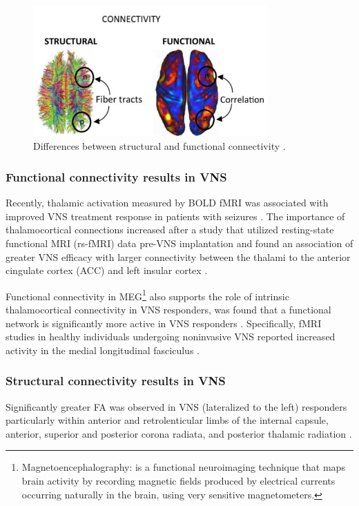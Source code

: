     \begin{figure}[h]
      \centering
      \includegraphics[width=0.8\textwidth]{images/structuralFunctional.png}
      \caption{Differences between structural and functional connectivity \cite{CABRAL201784}.}
      \label{fig:Structural and Functional Connections}
    \end{figure}

    \subsubsection*{Functional connectivity results in VNS}
    Recently, thalamic activation measured by BOLD fMRI was associated with improved VNS treatment response in patients with seizures \cite{NarayananWatts2002}. The importance of thalamocortical connections increased after a study that utilized resting-state functional MRI (rs-fMRI) data pre-VNS implantation and found an association of greater VNS efficacy with larger connectivity between the thalami to the anterior cingulate cortex (ACC) and left insular cortex \cite{IBRAHIM2017634}. 
    
    Functional connectivity in MEG\footnote{Magnetoencephalography: is a functional neuroimaging technique that maps brain activity by recording magnetic fields produced by electrical currents occurring naturally in the brain, using very sensitive magnetometers.} also supports the role of intrinsic thalamocortical connectivity in VNS responders, was found that a functional network is significantly more active in VNS responders \cite{Mithani2019, Mithani2020}. Specifically, fMRI studies in healthy individuals undergoing noninvasive VNS reported increased activity in the medial longitudinal fasciculus \cite{frangos2017access}.

    \subsubsection*{Structural connectivity results in VNS}
    Significantly greater FA was observed in VNS (lateralized to the left) responders particularly within anterior and retrolenticular limbs of the internal capsule, anterior, superior and posterior corona radiata, and posterior thalamic radiation \cite{Mithani2019}.


